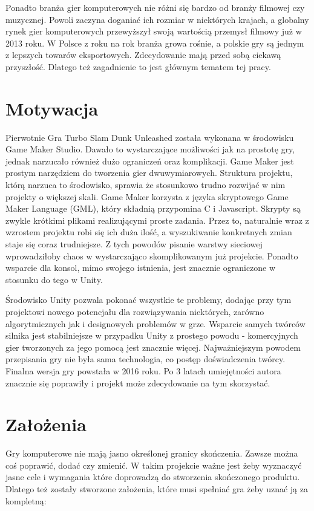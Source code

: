 \documentclass[a4paper,12pt,twoside,openany]{report}
\begin{document}
Ponadto branża gier komputerowych nie różni się bardzo od branży filmowej czy muzycznej. Powoli zaczyna doganiać ich rozmiar w niektórych krajach, a globalny rynek gier komputerowych przewyższył swoją wartością przemysł filmowy już w 2013 roku. W Polsce z roku na rok branża growa rośnie, a polskie gry są jednym z lepszych towarów eksportowych\cite{canalplus_gry}. Zdecydowanie mają przed sobą ciekawą przyszłość. Dlatego też zagadnienie to jest głównym tematem tej pracy. 

\section{Motywacja}
Pierwotnie Gra Turbo Slam Dunk Unleashed została wykonana w środowisku Game Maker Studio. Dawało to wystarczające możliwości jak na prostotę gry, jednak narzucało również dużo ograniczeń oraz komplikacji. Game Maker jest prostym narzędziem do tworzenia gier dwuwymiarowych. Struktura projektu, którą narzuca to środowisko, sprawia że stosunkowo trudno rozwijać w nim projekty o większej skali. Game Maker korzysta z języka skryptowego Game Maker Language (GML), który składnią przypomina C i Javascript. Skrypty są zwykle krótkimi plikami realizującymi proste zadania. Przez to, naturalnie wraz z wzrostem projektu robi się ich duża ilość, a wyszukiwanie konkretnych zmian staje się coraz trudniejsze. Z tych powodów pisanie warstwy sieciowej wprowadziłoby chaos w wystarczająco skomplikowanym już projekcie.  Ponadto wsparcie dla konsol, mimo swojego istnienia, jest znacznie ograniczone w stosunku do tego w Unity.

Środowisko Unity pozwala pokonać wszystkie te problemy, dodając przy tym projektowi nowego potencjału dla rozwiązywania niektórych, zarówno algorytmicznych jak i designowych problemów w grze. Wsparcie samych twórców silnika jest stabilniejsze w przypadku Unity z prostego powodu - komercyjnych gier tworzonych za jego pomocą jest znacznie więcej. Najważniejszym powodem przepisania gry nie była sama technologia, co postęp doświadczenia twórcy. Finalna wersja gry powstała w 2016 roku. Po 3 latach umiejętności autora znacznie się poprawiły i projekt może zdecydowanie na tym skorzystać. 

\section{Założenia}
Gry komputerowe nie mają jasno określonej granicy skończenia. Zawsze można coś poprawić, dodać czy zmienić. W takim projekcie ważne jest żeby wyznaczyć jasne cele i wymagania które doprowadzą do stworzenia skończonego produktu. Dlatego też zostały stworzone założenia, które musi spełniać gra żeby uznać ją za kompletną:
\end{document}
